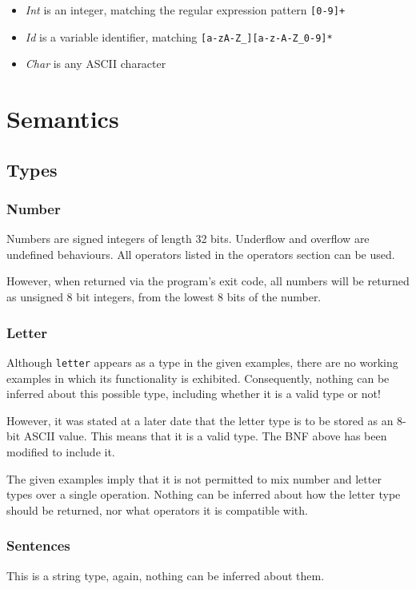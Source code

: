 \documentclass[a4paper,11pt]{article}
\begin{document}
\begin{itemize}
\item \emph{Int} is an integer, matching the regular expression pattern \verb:[0-9]+:
\item \emph{Id} is a variable identifier, matching \verb:[a-zA-Z_][a-z-A-Z_0-9]*:
\item \emph{Char} is any ASCII character
\end{itemize}

\section{Semantics}
\subsection{Types}
\subsubsection{Number}
Numbers are signed integers of length 32 bits. Underflow and overflow are
undefined behaviours. All operators listed in the operators section can be
used.

However, when returned via the program's exit code, all numbers will be
returned as unsigned 8 bit integers, from the lowest 8 bits of the number.

\subsubsection{Letter}
Although \verb:letter: appears as a type in the given examples, there are no
working examples in which its functionality is exhibited. Consequently, nothing
can be inferred about this possible type, including whether it is a valid type
or not!

However, it was stated at a later date that the letter type is to be stored as
an 8-bit ASCII value. This means that it is a valid type. The BNF above has been
modified to include it.

The given examples imply that it is not permitted to mix number and letter types
over a single operation. Nothing can be inferred about how the letter type should
be returned, nor what operators it is compatible with.

\subsubsection{Sentences}
This is a string type, again, nothing can be inferred about them.
\end{document}
